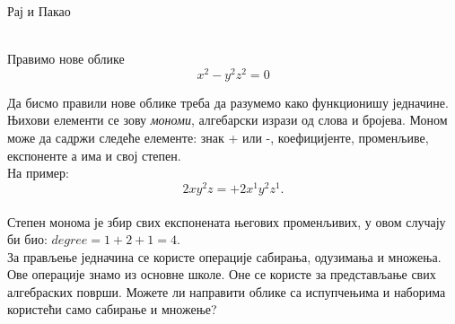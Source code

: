 \documentclass[en]{./../../common/SurferDesc}%
\begin{document}
\footnotesize


\begin{surferPage}
  \begin{surferTitle}Рај и Пакао\end{surferTitle}  \\
Правимо нове облике \\
\smallskip
\[x^2	- y^2z^2	= 0\]

\singlespacing
Да бисмо правили нове облике треба да разумемо како функционишу једначине. Њихови елементи се зову {\it мономи}, алгебарски изрази од слова и бројева.
\singlespacing
Моном може да садржи следеће елементе:
знак + или -, коефицијенте, променљиве, експоненте а има и свој степен.\\
\singlespacing
На пример: 
\smallskip
\[2xy^2z = +2x^1y^2z^1.\]
\\
\smallskip
Степен монома је збир свих експонената његових променљивих, у овом случају би био: $degree = 1+2+1=4$.  \\
\singlespacing
За прављење једначина се користе операције сабирања, одузимања и множења. Ове операције знамо из основне школе. Оне се користе за представљање свих алгебраских површи.
\singlespacing
Можете ли направити облике са испупчењима и наборима користећи само сабирање и множење?


  \begin{surferText}
     \end{surferText}
\end{surferPage}
\end{document}
